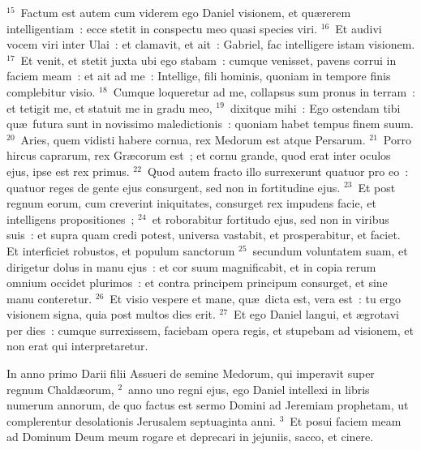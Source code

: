 ${}^{15}$~Factum est autem cum viderem ego Daniel visionem, et qu\ae rerem intelligentiam~: ecce stetit in conspectu meo quasi species viri.
${}^{16}$~Et audivi vocem viri inter Ulai~: et clamavit, et ait~: Gabriel, fac intelligere istam visionem.
${}^{17}$~Et venit, et stetit juxta ubi ego stabam~: cumque venisset, pavens corrui in faciem meam~: et ait ad me~: Intellige, fili hominis, quoniam in tempore finis complebitur visio.
${}^{18}$~Cumque loqueretur ad me, collapsus sum pronus in terram~: et tetigit me, et statuit me in gradu meo,
${}^{19}$~dixitque mihi~: Ego ostendam tibi qu\ae\ futura sunt in novissimo maledictionis~: quoniam habet tempus finem suum.
${}^{20}$~Aries, quem vidisti habere cornua, rex Medorum est atque Persarum.
${}^{21}$~Porro hircus caprarum, rex Gr\ae corum est~; et cornu grande, quod erat inter oculos ejus, ipse est rex primus.
${}^{22}$~Quod autem fracto illo surrexerunt quatuor pro eo~: quatuor reges de gente ejus consurgent, sed non in fortitudine ejus.
${}^{23}$~Et post regnum eorum, cum creverint iniquitates, consurget rex impudens facie, et intelligens propositiones~;
${}^{24}$~et roborabitur fortitudo ejus, sed non in viribus suis~: et supra quam credi potest, universa vastabit, et prosperabitur, et faciet. Et interficiet robustos, et populum sanctorum
${}^{25}$~secundum voluntatem suam, et dirigetur dolus in manu ejus~: et cor suum magnificabit, et in copia rerum omnium occidet plurimos~: et contra principem principum consurget, et sine manu conteretur.
${}^{26}$~Et visio vespere et mane, qu\ae\ dicta est, vera est~: tu ergo visionem signa, quia post multos dies erit.
${}^{27}$~Et ego Daniel langui, et \ae grotavi per dies~: cumque surrexissem, faciebam opera regis, et stupebam ad visionem, et non erat qui interpretaretur.

\lettrine[lines=10,image=true,loversize=0.05,lraise=-0.03]{I}{}n anno primo Darii filii Assueri de semine Medorum, qui imperavit super regnum Chald\ae orum,
${}^{2}$~anno uno regni ejus, ego Daniel intellexi in libris numerum annorum, de quo factus est sermo Domini ad Jeremiam prophetam, ut complerentur desolationis Jerusalem septuaginta anni.
${}^{3}$~Et posui faciem meam ad Dominum Deum meum rogare et deprecari in jejuniis, sacco, et cinere.


